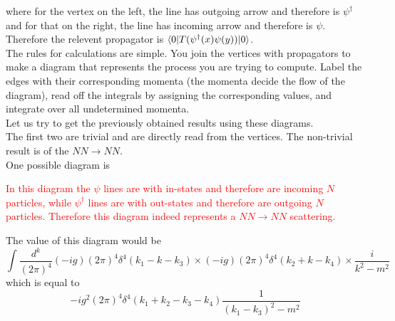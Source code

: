 \documentclass[11pt, notitlepage]{report}
\numberwithin{equation}{section}
\begin{document}
    where for the vertex on the left, the line has outgoing arrow and therefore is \(\psi^\dagger\) and for that on the right, the line has incoming arrow and therefore is \(\psi\). Therefore the relevent propagator is \(\braket{0|T(\psi^\dagger(x)\psi(y))|0}\).\\
    
    
    The rules for calculations are simple. You join the vertices with propagators to make a diagram that represents the process you are trying to compute. Label the edges with their corresponding momenta (the momenta decide the flow of the diagram), read off the integrals by assigning the corresponding values, and integrate over all undetermined momenta.\\

    Let us try to get the previously obtained results using these diagrams.\\ The first two are trivial and are directly read from the vertices. The non-trivial result is of the \(NN \to NN\). \\ One possible diagram is 
    \begin{figure}[h]
        \centering
    \end{figure}

    \textcolor{red}{
        In this diagram the \(\psi\) lines are with in-states and therefore are incoming \(N\) particles, while \(\psi^\dagger\) lines are with out-states and therefore are outgoing \(N\) particles. Therefore this diagram indeed represents a \(NN\to NN\) scattering.\\
    }

    The value of this diagram would be 
    \begin{equation*}
        \int \frac{d^k}{(2\pi)^4}(-ig)(2\pi)^4\delta^4(k_1 - k - k_3)\times(-ig)(2\pi)^4\delta^4(k_2 + k - k_4)\times \frac{i}{k^2 - m^2} 
    \end{equation*}
    which is equal to 
    \begin{equation*}
        -ig^2 (2\pi)^4\delta^4(k_1 +k_2 - k_3 - k_4) \frac{1}{(k_1 - k_3)^2 - m^2}
    \end{equation*}
\end{document}
